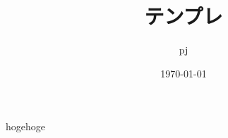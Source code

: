 \documentclass[11pt,a4paper,dvipdfmx]{jsarticle}
\title{テンプレ}
\author{pj}
\date{\today}
\begin{document}
\maketitle
hogehoge
\end{document}
